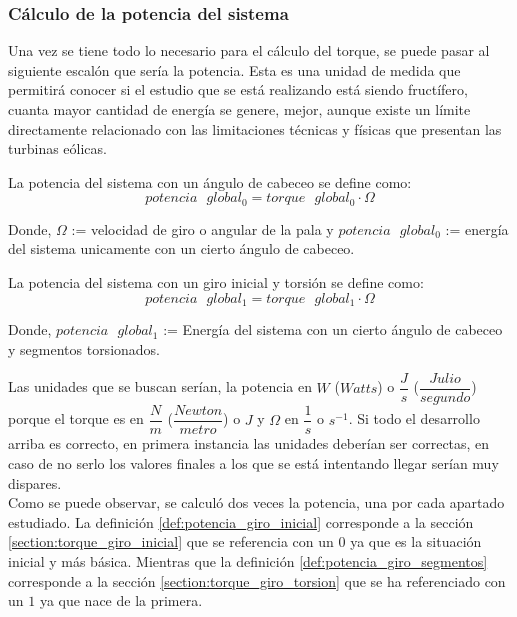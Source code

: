\subsubsection{Cálculo de la potencia del sistema}
\label{section:pot_sistema}
 
 Una vez se tiene todo lo necesario para el cálculo del torque, se puede pasar al siguiente escalón que sería la potencia. Esta es una unidad de medida que permitirá conocer si el estudio que se está realizando está siendo fructífero, cuanta mayor cantidad de energía se genere, mejor, aunque existe un límite directamente relacionado con las limitaciones técnicas y físicas que presentan las turbinas eólicas. \\
 
  \begin{definicion}
 La potencia del sistema con un ángulo de cabeceo se define como:
 $$ potencia \text{ } global_0 = torque \text{ } global_0 \cdot \Omega $$ 
 
 Donde,
  \centering $\Omega$ := velocidad de giro o angular de la pala y $potencia \text{ } global_0$ := energía del sistema unicamente con un cierto ángulo de cabeceo.
 \label{def:potencia_giro_inicial}
 \end{definicion}
 
   \begin{definicion}
 La potencia del sistema con un giro inicial y torsión se define como:
 $$ potencia \text{ } global_1 = torque \text{ } global_1 \cdot \Omega $$ 
 
 Donde,
 \centering $potencia \text{ } global_1$ := Energía del sistema con un cierto ángulo de cabeceo y segmentos torsionados.
 \label{def:potencia_giro_segmentos}
 \end{definicion}
 
 
Las unidades que se buscan serían, la potencia en $W$ ($Watts$) o $\dfrac{J}{s}$ ($\dfrac{Julio}{segundo}$) porque el torque es en $\dfrac{N}{m}$ ($\dfrac{Newton}{metro}$) o $J$ y $\Omega$ en $\dfrac{1}{s}$ o $s^{-1}$. Si todo el desarrollo arriba es correcto, en primera instancia las unidades deberían ser correctas, en caso de no serlo los valores finales a los que se está intentando llegar serían muy dispares. \\

 
 Como se puede observar, se calculó dos veces la potencia, una por cada apartado estudiado. La definición \ref{def:potencia_giro_inicial} corresponde a la sección \ref{section:torque_giro_inicial} que se referencia con un $0$ ya que es la situación inicial y más básica. Mientras que la definición \ref{def:potencia_giro_segmentos} corresponde a la sección \ref{section:torque_giro_torsion} que se ha referenciado con un $1$ ya que nace de la primera.
 
